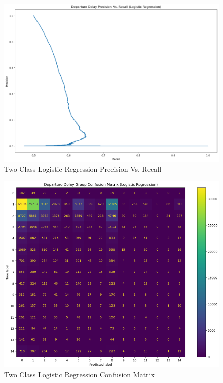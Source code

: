 \documentclass[a4paper,12pt]{article}
\begin{document}
\begin{figure}[!]
    \centering
    \includegraphics*[scale=.45]{../../img/model_rq2_prec_recall.png}
    \caption[]{Two Class Logistic Regression Precision Vs. Recall}
    \label{fig:model:rq2:prec_recall}
\end{figure}

\begin{figure}[!]
    \centering
    \includegraphics*[scale=.50]{../../img/model_rq2_cfmtrx_2.png}
    \caption[]{Two Class Logistic Regression Confusion Matrix}
    \label{fig:model:rq2:cfmtrx_2}
\end{figure}
\end{document}
